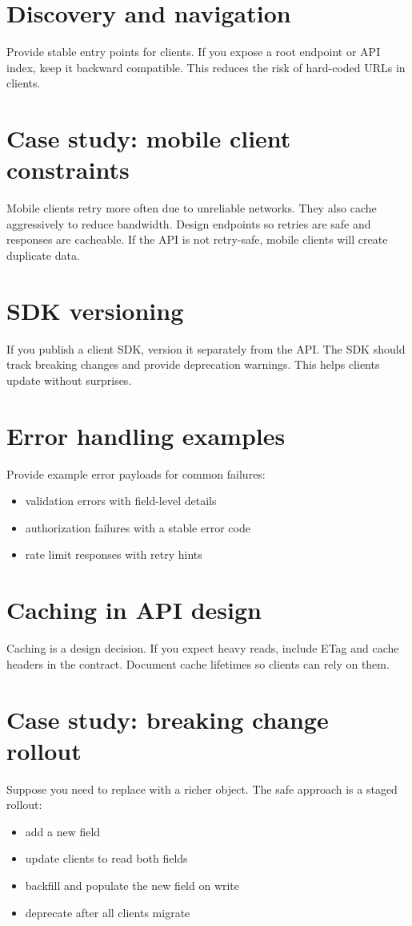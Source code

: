 \section{Discovery and navigation}
Provide stable entry points for clients.
If you expose a root endpoint or API index, keep it backward compatible.
This reduces the risk of hard-coded URLs in clients.

\section{Case study: mobile client constraints}
Mobile clients retry more often due to unreliable networks.
They also cache aggressively to reduce bandwidth.
Design endpoints so retries are safe and responses are cacheable.
If the API is not retry-safe, mobile clients will create duplicate data.

\section{SDK versioning}
If you publish a client SDK, version it separately from the API.
The SDK should track breaking changes and provide deprecation warnings.
This helps clients update without surprises.

\section{Error handling examples}
Provide example error payloads for common failures:
\begin{itemize}[nosep]
  \item validation errors with field-level details
  \item authorization failures with a stable error code
  \item rate limit responses with retry hints
\end{itemize}

\section{Caching in API design}
Caching is a design decision.
If you expect heavy reads, include ETag and cache headers in the contract.
Document cache lifetimes so clients can rely on them.

\section{Case study: breaking change rollout}
Suppose you need to replace  with a richer object.
The safe approach is a staged rollout:
\begin{itemize}[nosep]
  \item add a new  field
  \item update clients to read both fields
  \item backfill and populate the new field on write
  \item deprecate  after all clients migrate
\end{itemize}

